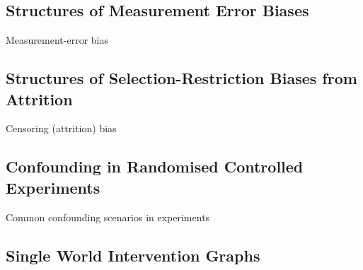 \documentclass[
  single column]{article}
\begin{document}
\newpage{}

\subsection{Structures of Measurement Error
Biases}\label{structures-of-measurement-error-biases}

\begin{table}

\caption{\label{tbl-measurement-error}Measurement-error bias}

\centering{

\terminologymeasurementerror

}

\end{table}%

\newpage{}

\subsection{Structures of Selection-Restriction Biases from
Attrition}\label{structures-of-selection-restriction-biases-from-attrition}

\begin{table}

\caption{\label{tbl-censoring-bias}Censoring (attrition) bias}

\centering{

\terminologycensoring

}

\end{table}%

\newpage{}

\subsection{Confounding in Randomised Controlled
Experiments}\label{section-confounding-experiments}

\begin{table}

\caption{\label{tbl-experiments}Common confounding scenarios in
experiments}

\centering{

\terminologyelconfoundersexperiments

}

\end{table}%

\newpage{}

\subsection{Single World Intervention
Graphs}\label{single-world-intervention-graphs}
\end{document}
